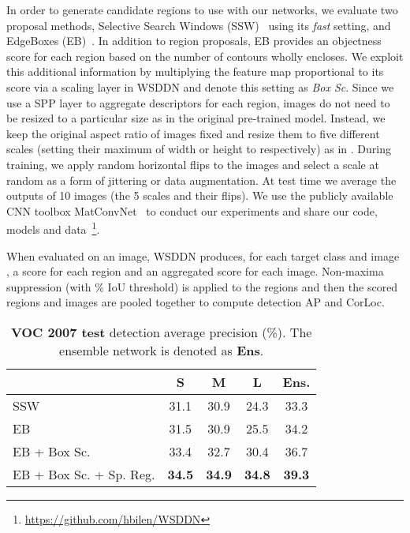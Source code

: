 \documentclass[10pt,twocolumn,letterpaper]{article}
\begin{document}
In order to generate candidate regions to use with our networks, we evaluate two proposal methods, Selective Search Windows (SSW)~\cite{Sande11} using its \textit{fast} setting, and EdgeBoxes (EB)~\cite{Zitnick14}. In addition to region proposals, EB provides an objectness score for each region based on the number of contours wholly encloses. We exploit this additional information by multiplying the feature map  proportional to its score via a scaling layer in WSDDN and denote this setting as \emph{Box Sc}. Since we use a SPP layer to aggregate descriptors for each region, images do not need to be resized to a particular size as in the original pre-trained model. Instead, we keep the original aspect ratio of images fixed and resize them to five different scales (setting their maximum of width or height to  respectively) as in \cite{He14}. During training, we apply random horizontal flips to the images and select a scale at random as a form of jittering or data augmentation. At test time we average the outputs of 10 images (\ie the 5 scales and their flips). We use the publicly available CNN toolbox MatConvNet~\cite{Vedaldi15} to conduct our experiments and share our code, models and data~\footnote{\url{https://github.com/hbilen/WSDDN}}.

When evaluated on an image, WSDDN produces, for each target class  and image , a score  for each region  and an aggregated score  for each image. Non-maxima suppression (with  \% IoU threshold) is applied to the regions and then the scored regions and images are pooled together to compute detection AP and CorLoc.

 \begin{table}
\begin{center}
\begin{tabular}{lccc|c}
& \textbf{S} & \textbf{M} & \textbf{L} & \textbf{Ens.}\\
\toprule
SSW                                       & 31.1 & 30.9 & 24.3 & 33.3 \\
EB                                        & 31.5 & 30.9 & 25.5 & 34.2 \\
EB + Box Sc. & 33.4 & 32.7 & 30.4 & 36.7\\
EB + Box Sc. + Sp. Reg.        & \bf{34.5} & \bf{34.9} & \bf{34.8} & \bf{39.3} \\
\end{tabular}
\vspace{0.2em}
\caption{{\bf VOC 2007 test} detection average precision (\%). The ensemble network is denoted as \textbf{Ens}.}
 \label{tab:voc2007base}
\end{center}
\end{table}
\end{document}
